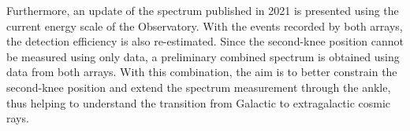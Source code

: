 Furthermore, an update of the  spectrum published in 2021 is presented using the current energy scale of the Observatory.
With the events recorded by both arrays, the  detection efficiency is also re-estimated.
Since the second-knee position cannot be measured using only  data, a preliminary combined spectrum is obtained using data from both arrays.
With this combination, the aim is to better constrain the second-knee position and extend the spectrum measurement through the ankle, thus helping to understand the transition from Galactic to extragalactic cosmic rays.
